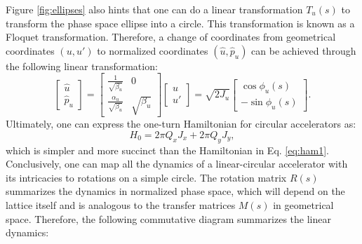 Figure \ref{fig:ellipses} also hints that one can do a linear transformation $T_u(s)$ to transform the phase space ellipse into a circle. This transformation is known as a Floquet transformation. Therefore, a change of coordinates from geometrical coordinates $(u,u')$ to normalized coordinates $(\hat{u},\hat{p}_u)$ can be achieved through the following linear transformation:
\begin{equation}
    \label{eq:floquet}
    \begin{bmatrix} 
        \hat{u} \\
        \hat{p}_u     
    \end{bmatrix}
    =
    \begin{bmatrix} 
        \frac{1}{\sqrt{\beta_u}} & 0 \\ 
        \frac{\alpha_u}{\sqrt{\beta_u}} & \sqrt{\beta_u}
    \end{bmatrix}
    \begin{bmatrix} 
        u \\
        u'     
    \end{bmatrix}
    =
    \sqrt{2J_u}
    \begin{bmatrix} 
        \cos \phi _u (s) \\
        -\sin \phi _u (s)    
    \end{bmatrix}.
\end{equation}
Ultimately, one can express the one-turn Hamiltonian for circular accelerators as:
\begin{equation}
    \label{eq:hflo}
    H_0=2\pi Q_x J_x + 2\pi Q_y J_y,
\end{equation}
which is simpler and more succinct than the Hamiltonian in Eq. \ref{eq:ham1}. Conclusively, one can map all the dynamics of a linear-circular accelerator with its intricacies to rotations on a simple circle. The rotation matrix $R(s)$ summarizes the dynamics in normalized phase space, which will depend on the lattice itself and is analogous to the transfer matrices $M(s)$ in geometrical space. Therefore, the following commutative diagram summarizes the linear dynamics:      
